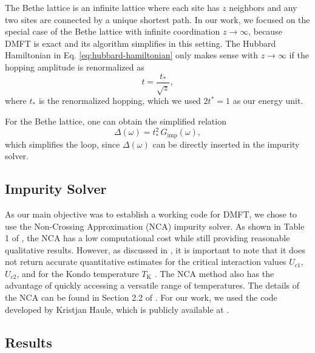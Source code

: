 \documentclass[12pt]{report}
\newcommand{\ALERT}[1]{\textcolor{red}{#1}}
\begin{document}
The Bethe lattice is an infinite lattice where each site has $z$ neighbors and any two sites are connected by a unique shortest path. In our work, we focused on the special case of the Bethe lattice with infinite coordination $z\to\infty$, because DMFT is exact and its algorithm simplifies in this setting. The Hubbard Hamiltonian in Eq. \eqref{eq:hubbard-hamiltonian} only makes sense with $z\to\infty$ if the hopping amplitude is renormalized as \cite{thesis_bruno}
\begin{equation} \label{eq:hopping-renormalization}
t = \frac{t_*}{\sqrt{z}},
\end{equation}
where $t_*$ is the renormalized hopping, which we used $2t^* = 1$ as our energy unit.

For the Bethe lattice, one can obtain the simplified relation \cite{thesis_bruno}
\begin{equation} \label{eq:simple-hybridization-bethe}
\Delta(\omega) = t_*^2 \, G_{\text{imp}}(\omega),
\end{equation}
which simplifies the loop, since $\Delta(\omega)$ can be directly inserted in the impurity solver.

\subsection{Impurity Solver} \label{sec:impurity-solver}

As our main objective was to establish a working code for DMFT, we chose to use the Non-Crossing Approximation (NCA) impurity solver. As shown in Table 1 of \cite{impurity-solvers}, the NCA has a low computational cost while still providing reasonable qualitative results. However, as discussed in \cite{vildosola2015}, it is important to note that it does not return accurate quantitative estimates for the critical interaction values $U_{c1}$, $U_{c2}$, and for the Kondo temperature $T_{\text{K}}$ \cite{haule_real_materials, vildosola2015}. The NCA method also has the advantage of quickly accessing a versatile range of temperatures. The details of the NCA can be found in Section 2.2 of \cite{thesis_bruno}. For our work, we used the code developed by Kristjan Haule, which is publicly available at \cite{hauleweb}.


\subsection{Results} \label{sec:results}
\end{document}
